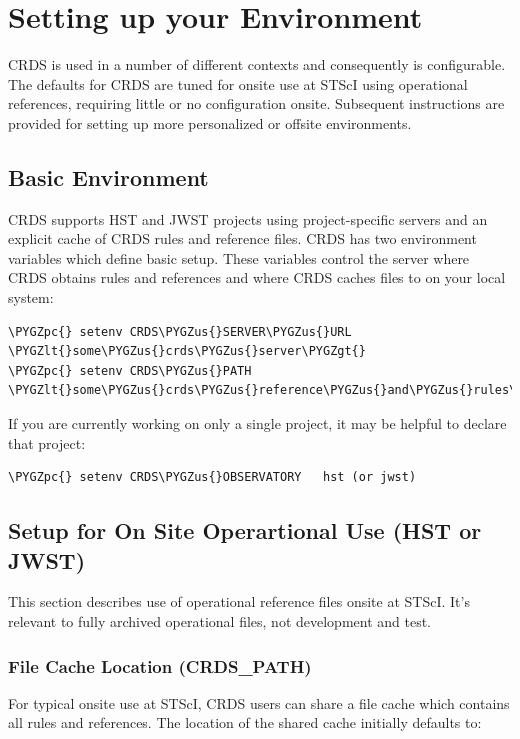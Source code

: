 \documentclass[letterpaper,10pt,english]{sphinxmanual}
\def\PYGZus{\char`\_}
\def\PYGZlt{\char`\<}
\def\PYGZgt{\char`\>}
\def\PYGZpc{\char`\%}
\begin{document}
\chapter{Setting up your Environment}
\label{installation:setting-up-your-environment}
CRDS is used in a number of different contexts and consequently is configurable.   The defaults for
CRDS are tuned for onsite use at STScI using operational references,  requiring little or no configuration onsite.
Subsequent instructions are provided for setting up more personalized or offsite environments.


\section{Basic Environment}
\label{installation:basic-environment}
CRDS supports HST and JWST projects using project-specific servers and an explicit cache of CRDS rules and reference
files.   CRDS has two environment variables which define basic setup.   These variables control the server where CRDS
obtains rules and references and where CRDS caches files to on your local system:

\begin{Verbatim}[commandchars=\\\{\}]
\PYGZpc{} setenv CRDS\PYGZus{}SERVER\PYGZus{}URL  \PYGZlt{}some\PYGZus{}crds\PYGZus{}server\PYGZgt{}
\PYGZpc{} setenv CRDS\PYGZus{}PATH        \PYGZlt{}some\PYGZus{}crds\PYGZus{}reference\PYGZus{}and\PYGZus{}rules\PYGZus{}cache\PYGZus{}directory\PYGZgt{}
\end{Verbatim}

If you are currently working on only a single project,  it may be helpful to declare that project:

\begin{Verbatim}[commandchars=\\\{\}]
\PYGZpc{} setenv CRDS\PYGZus{}OBSERVATORY   hst (or jwst)
\end{Verbatim}


\section{Setup for On Site Operartional Use (HST or JWST)}
\label{installation:setup-for-on-site-operartional-use-hst-or-jwst}
This section describes use of operational reference files onsite at STScI.  It's relevant to fully archived
operational files,  not development and test.


\subsection{File Cache Location (CRDS\_PATH)}
\label{installation:file-cache-location-crds-path}
For typical onsite use at STScI, CRDS users can share a file cache which contains all rules and references.  The
location of the shared cache initially defaults to:
\end{document}
